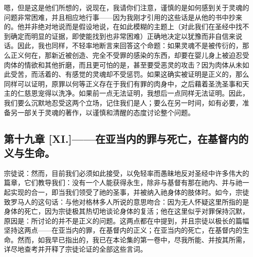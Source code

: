 嗯，但是这是他们所想的，说现在，我请你们注意，谨慎的是如何感到关于灵魂的问题非常困难，并且相应地行事——因为我刚才引用的这些话是从他的书中抄来的。他并非绝对地说而是假设地说，在如此模糊的主题上（对此我们在圣经中找不到确定而明显的证据，即使能找到也非常困难）正确地决定以犹豫而非自信来说话。因此，我也同样，不轻率地断言来回答这个命题：如果灵魂不是被传衍的，那么正义何在，那新近被创造、完全不受罪的感染的东西，却要在婴儿身上被迫忍受肉体的情欲和其他折磨，而且更可怕的是，甚至要受恶灵的攻击？因为肉体从未如此受苦，而活着的、有感觉的灵魂却不受惩罚。如果这确实被证明是正义的，那么同样可以证明，原罪以何等正义存在于我们有罪的肉身中，之后藉着圣洗圣事和天主的仁慈恩宠得以洗净。如果前一点无法证明，我想后一点同样无法证明。因此，我们要么沉默地忍受这两个立场，记住我们是人；要么在另一时间，如有必要，准备另一部关于灵魂的著作，以谨慎和清醒的态度讨论整个问题。\par


\subsection{第十九章 [XI.]——在亚当内的罪与死亡，在基督内的义与生命。}

宗徒说：然而，目前我们必须如此接受，以免轻率而愚昧地反对圣经中许多伟大的篇章，它们教导我们：没有一个人能获得永生，除非与基督有那在祂内、并与祂一起实现的合一，即当我们领受了祂的圣事，并被纳入祂身体的肢体时。如今，宗徒致罗马人的这句话：与他对格林多人所说的意思吻合：因为无人怀疑这里所指的是身体的死亡，因为宗徒极其热切地谈论身体的复活；他在这里似乎对罪保持沉默，原因是：所讨论的并不是正义的问题。这两点都在中提到，并且宗徒以极长的篇幅坚持这两点——在亚当内的罪，在基督内的正义；在亚当内的死亡，在基督内的生命。然而，如我早已指出的，我已在本论集的第一卷中，尽我所能、并按其所需，详尽地查考并开释了宗徒论证的全部这些言词。\par

